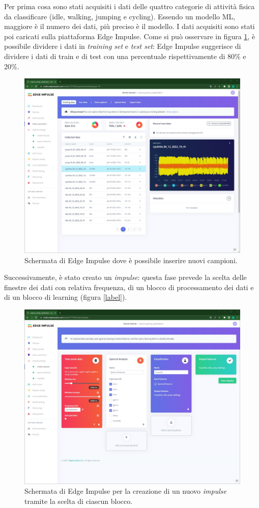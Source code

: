 Per prima cosa sono stati acquisiti i dati delle quattro categorie di attività fisica da classificare (idle, walking, jumping e cycling). Essendo un modello ML, maggiore è il numero dei dati, più preciso è il modello. I dati acquisiti sono stati poi caricati sulla piattaforma Edge Impulse. Come si può osservare in figura \ref{fig:acquisizione_dati}, è possibile dividere i dati in \textit{training set} e \textit{test set}: Edge Impulse suggerisce di dividere i dati di train e di test con una percentuale rispettivamente di 80\% e 20\%.
\begin{figure}[h!]
	\centering
	\includegraphics[width=0.5\linewidth]{./ImageFiles/data_acquisition.jpg}
	\caption{Schermata di Edge Impulse dove è possibile inserire nuovi campioni.}
	\label{fig:acquisizione_dati}
\end{figure}

Successivamente, è stato creato un \textit{impulse}: questa fase prevede la scelta delle finestre dei dati con relativa frequenza, di un blocco di processamento dei dati e di un blocco di learning (figura \ref{label}).
\begin{figure}[h!]
	\centering
	\includegraphics[width=0.5\linewidth]{./ImageFiles/creazione_impulse.jpg}
	\caption{Schermata di Edge Impulse per la creazione di un nuovo \textit{impulse} tramite la scelta di ciascun blocco.}
	\label{fig:creazione_impulse}
\end{figure}

